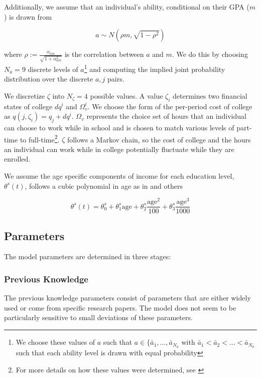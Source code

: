   Additionally, we assume that an individual's ability, conditional on their GPA ($m$) is drawn from

  $$a \sim N(\rho m, \sqrt{1 - \rho^2})$$

  where $\rho := \frac{\alpha_{am}}{\sqrt{1 + \alpha_{am}^2}}$ is the correlation between $a$ and
  $m$. We do this by choosing $N_a=9$ discrete levels of $a$\footnote{We choose these values of $a$
  such that $a \in \{\bar{a}_1, \dots, \bar{a}_{N_a}$ with $\bar{a}_1 < \bar{a}_2 < \dots <
  \bar{a}_{N_a}$ such that each ability level is drawn with equal probability} and computing the
  implied joint probability distribution over the discrete $a, j$ pairs.

  We discretize $\zeta$ into $N_\zeta=4$ possible values. A value $\zeta_i$ determines two financial
  states of college $dq^i$ and $\Omega_v^i$. We choose the form of the per-period cost of college as
  $q(j, \zeta_i) = q_j + dq^i$. $\Omega_v$ represents the choice set of hours that an individual can
  choose to work while in school and is chosen to match various levels of part-time to
  full-time\footnote{For more details on how these values were determined, see
  \cite{HendricksLeukhina2017}}. $\zeta$ follows a Markov chain, so the cost of college and the
  hours an individual can work while in college potentially fluctuate while they are enrolled.

  We assume the age specific components of income for each education level, $\theta^s(t)$, follows a
  cubic polynomial in age as in \cite{Guvenen2009} and others

  $$\theta^s(t) = \theta^s_0 + \theta^s_1 \text{age} + \theta^s_2 \frac{\text{age}^2}{100} + \theta^s_3 \frac{\text{age}^3}{1000}$$


\subsection{Parameters}

  The model parameters are determined in three stages:


  \subsubsection{Previous Knowledge}

    The previous knowledge parameters consist of parameters that are either widely used or come from
    specific research papers. The model does not seem to be particularly sensitive to small
    deviations of these parameters.

